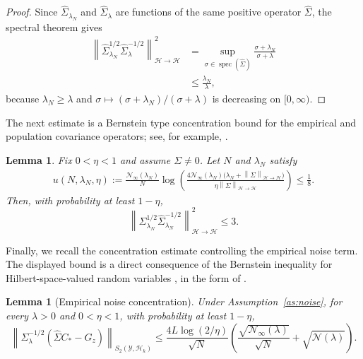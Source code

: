 \documentclass[11pt]{article}
\numberwithin{equation}{section}
\theoremstyle{plain}
\newtheorem{lemma}[theorem]{Lemma}
\theoremstyle{definition}
\theoremstyle{remark}
\newcommand{\Hs}{\mathcal{H}}
\newcommand{\Y}{\mathcal{Y}}
\newcommand{\norm}[1]{\left\lVert#1\right\rVert}
\begin{document}
\begin{proof}
Since $\hat{\Sigma}_{\lambda_N}$ and
$\hat{\Sigma}_{\lambda}$ are functions of the same positive operator
$\hat{\Sigma}$, the spectral theorem gives
\begin{align*}
\norm{\hat{\Sigma}_{\lambda_N}^{1/2}
\hat{\Sigma}_{\lambda}^{-1/2}}_{\Hs\to\Hs}^{2}
&=
\sup_{\sigma\in\operatorname{spec}(\hat{\Sigma})}
\frac{\sigma+\lambda_N}{\sigma+\lambda}\\
&\leq
\frac{\lambda_N}{\lambda},
\end{align*}
because $\lambda_N\geq\lambda$ and
$\sigma\mapsto(\sigma+\lambda_N)/(\sigma+\lambda)$ is decreasing on
$[0,\infty)$.
\end{proof}

The next estimate is a Bernstein type concentration bound for the empirical
and population covariance operators; see, for example,
\cite[Lemma~12]{zhang2024optimality}.

\begin{lemma}\label{lem:bernstein_conc}
Fix $0<\eta<1$ and assume $\Sigma\neq0$. Let $N$ and $\lambda_N$ satisfy
\begin{align}
\label{eq:conc_cond}
u(N,\lambda_N,\eta)
:=
\frac{\mathcal{N}_{\infty}(\lambda_N)}{N}
\log\left(
\frac{
4\mathcal{N}_{\infty}(\lambda_N)
\bigl(\lambda_N+\norm{\Sigma}_{\Hs\to\Hs}\bigr)
}{
\eta\norm{\Sigma}_{\Hs\to\Hs}
}
\right)
\leq \frac{1}{8}.
\end{align}
Then, with probability at least $1-\eta$,
\begin{equation}
\label{eq:resolvent_concentration}
\norm{\Sigma_{\lambda_N}^{1/2}
\hat{\Sigma}_{\lambda_N}^{-1/2}}_{\Hs\to\Hs}^{2}
\leq 3.
\end{equation}
\end{lemma}

Finally, we recall the concentration estimate controlling the empirical
noise term. The displayed bound is a direct consequence of the Bernstein
inequality for Hilbert-space-valued random variables \cite{pinelis1994optimum},
in the form of \cite[Proposition~2]{caponnetto2007optimal}.

\begin{lemma}[Empirical noise concentration]
\label{lem:mom_bound}
Under Assumption~\ref{as:noise}, for every $\lambda>0$ and
$0<\eta<1$, with probability at least $1-\eta$,
\begin{equation}
\label{eq:noise_bound}
\norm{\Sigma_\lambda^{-1/2}
(\hat{\Sigma}C_*-G_z)}_{S_2(\Y,\Hs_k)}
\leq
\frac{4L\log(2/\eta)}{\sqrt{N}}
\left(
\frac{\sqrt{\mathcal{N}_{\infty}(\lambda)}}{\sqrt{N}}
+\sqrt{\mathcal{N}(\lambda)}
\right).
\end{equation}
\end{lemma}
\end{document}
